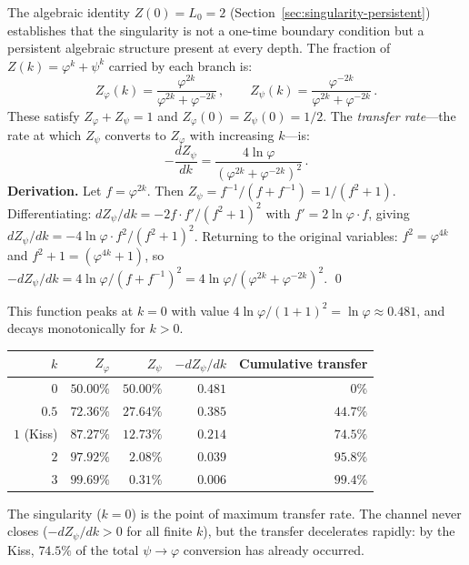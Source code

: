 \documentclass[12pt,a4paper]{article}
\begin{document}
The algebraic identity $Z(0) = L_0 = 2$ (Section~\ref{sec:singularity-persistent}) establishes that the singularity is not a one-time boundary condition but a persistent algebraic structure present at every depth.  The fraction of $Z(k) = \varphi^k + \psi^k$ carried by each branch is:
\begin{equation}
Z_\varphi(k) = \frac{\varphi^{2k}}{\varphi^{2k} + \varphi^{-2k}}\,,\qquad
Z_\psi(k) = \frac{\varphi^{-2k}}{\varphi^{2k} + \varphi^{-2k}}\,.
\end{equation}
These satisfy $Z_\varphi + Z_\psi = 1$ and $Z_\varphi(0) = Z_\psi(0) = 1/2$.  The \emph{transfer rate}---the rate at which $Z_\psi$ converts to $Z_\varphi$ with increasing $k$---is:
\begin{equation}
-\frac{dZ_\psi}{dk} = \frac{4\ln\varphi}{(\varphi^{2k} + \varphi^{-2k})^2}\,.
\label{eq:transfer-rate}
\end{equation}
\textbf{Derivation.}\;  Let $f = \varphi^{2k}$.  Then $Z_\psi = f^{-1}/(f + f^{-1}) = 1/(f^2 + 1)$.  Differentiating: $dZ_\psi/dk = -2f\cdot f'/(f^2+1)^2$ with $f' = 2\ln\varphi \cdot f$, giving $dZ_\psi/dk = -4\ln\varphi \cdot f^2/(f^2+1)^2$.  Returning to the original variables: $f^2 = \varphi^{4k}$ and $f^2 + 1 = (\varphi^{4k}+1)$, so $-dZ_\psi/dk = 4\ln\varphi/(f + f^{-1})^2 = 4\ln\varphi/(\varphi^{2k} + \varphi^{-2k})^2$. \qed

\noindent This function peaks at $k = 0$ with value $4\ln\varphi/(1+1)^2 = \ln\varphi \approx 0.481$, and decays monotonically for $k > 0$.

\begin{center}\small
\begin{tabular}{r|r|r|r|r}
$k$ & $Z_\varphi$ & $Z_\psi$ & $-dZ_\psi/dk$ & Cumulative transfer \\
\hline
$0$ & $50.00\%$ & $50.00\%$ & $0.481$ & $0\%$ \\
$0.5$ & $72.36\%$ & $27.64\%$ & $0.385$ & $44.7\%$ \\
$1$ (Kiss) & $87.27\%$ & $12.73\%$ & $0.214$ & $74.5\%$ \\
$2$ & $97.92\%$ & $2.08\%$ & $0.039$ & $95.8\%$ \\
$3$ & $99.69\%$ & $0.31\%$ & $0.006$ & $99.4\%$ \\
\end{tabular}
\end{center}

\noindent The singularity ($k = 0$) is the point of maximum transfer rate.  The channel never closes ($-dZ_\psi/dk > 0$ for all finite $k$), but the transfer decelerates rapidly: by the Kiss, $74.5\%$ of the total $\psi \to \varphi$ conversion has already occurred.
\end{document}
